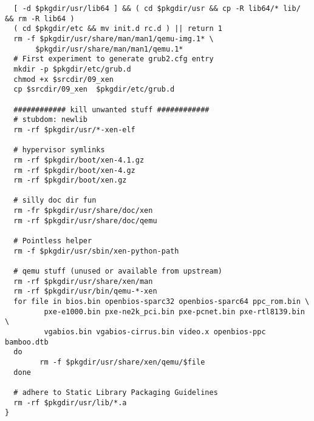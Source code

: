\begin{lstlisting}
  [ -d $pkgdir/usr/lib64 ] && ( cd $pkgdir/usr && cp -R lib64/* lib/ && rm -R lib64 )
  ( cd $pkgdir/etc && mv init.d rc.d ) || return 1
  rm -f $pkgdir/usr/share/man/man1/qemu-img.1* \
       $pkgdir/usr/share/man/man1/qemu.1*
  # First experiment to generate grub2.cfg entry
  mkdir -p $pkgdir/etc/grub.d
  chmod +x $srcdir/09_xen
  cp $srcdir/09_xen  $pkgdir/etc/grub.d

  ############ kill unwanted stuff ############
  # stubdom: newlib
  rm -rf $pkgdir/usr/*-xen-elf

  # hypervisor symlinks
  rm -rf $pkgdir/boot/xen-4.1.gz
  rm -rf $pkgdir/boot/xen-4.gz
  rm -rf $pkgdir/boot/xen.gz

  # silly doc dir fun
  rm -fr $pkgdir/usr/share/doc/xen
  rm -rf $pkgdir/usr/share/doc/qemu

  # Pointless helper
  rm -f $pkgdir/usr/sbin/xen-python-path

  # qemu stuff (unused or available from upstream)
  rm -rf $pkgdir/usr/share/xen/man
  rm -rf $pkgdir/usr/bin/qemu-*-xen
  for file in bios.bin openbios-sparc32 openbios-sparc64 ppc_rom.bin \
         pxe-e1000.bin pxe-ne2k_pci.bin pxe-pcnet.bin pxe-rtl8139.bin \
         vgabios.bin vgabios-cirrus.bin video.x openbios-ppc bamboo.dtb
  do
        rm -f $pkgdir/usr/share/xen/qemu/$file
  done

  # adhere to Static Library Packaging Guidelines
  rm -rf $pkgdir/usr/lib/*.a 	
}
\end{lstlisting}

